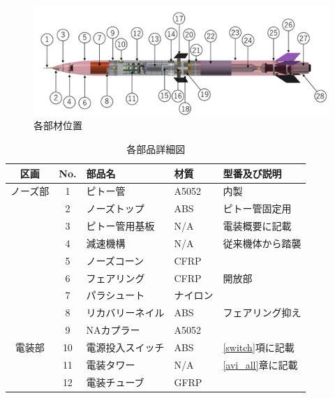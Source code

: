 \documentclass[a4paper,11pt,titlepage,uplatex]{jsarticle}
\begin{document}
\begin{figure}[H]
    \centering
    \includegraphics{pic_str/s_iti.png}
    \caption{各部材位置}
    \label{s_iti}
\end{figure}

\renewcommand{\arraystretch}{0.9}
\begin{longtable}[H]{cclll}
    \caption{各部品詳細図}
    \label{s_buhin}                                                    \\
    \toprule
    区画    & No. & 部品名       & 材質    & 型番及び説明                           \\ \hline \endhead
    ノーズ部  & 1   & ピトー管      & A5052 & 内製                               \\
          & 2   & ノーズトップ    & ABS   & ピトー管固定用                          \\
          & 3   & ピトー管用基板   & N/A   & 電装概要に記載                          \\
          & 4   & 減速機構      & N/A   & 従来機体から踏襲                         \\
          & 5   & ノーズコーン    & CFRP  &                                  \\
          & 6   & フェアリング    & CFRP  & 開放部                              \\
          & 7   & パラシュート    & ナイロン  &                                  \\
          & 8   & リカバリーネイル  & ABS   & フェアリング抑え                         \\\midrule
          & 9   & NAカプラー    & A5052 &                                  \\ \midrule
    電装部   & 10  & 電源投入スイッチ  & ABS   & \ref{switch}項に記載                 \\
          & 11  & 電装タワー     & N/A   & \ref{avi_all}章に記載                \\
          & 12  & 電装チューブ    & GFRP  &                                  \\

\end{longtable}
\end{document}
